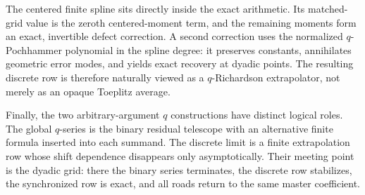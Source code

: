 \documentclass[11pt,oneside]{article}
\theoremstyle{definition}
\theoremstyle{remark}
\begin{document}
The centered finite spline sits directly inside the exact arithmetic.  Its matched-grid value
is the zeroth centered-moment term, and the remaining moments form an exact, invertible defect
correction.  A second correction uses the normalized $q$-Pochhammer polynomial in the spline
degree: it preserves constants, annihilates geometric error modes, and yields exact recovery
at dyadic points.  The resulting discrete row is therefore naturally viewed as a
$q$-Richardson extrapolator, not merely as an opaque Toeplitz average.

Finally, the two arbitrary-argument $q$ constructions have distinct logical roles.  The global
$q$-series is the binary residual telescope with an alternative finite formula inserted into
each summand.  The discrete limit is a finite extrapolation row whose shift dependence
disappears only asymptotically.  Their meeting point is the dyadic grid: there the binary
series terminates, the discrete row stabilizes, the synchronized row is exact, and all roads
return to the same master coefficient.
\end{document}
